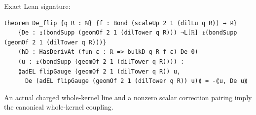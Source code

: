 \begin{theorem}[bp-113]
\begin{itemize}
\end{itemize}
\par Exact Lean signature:
\begin{verbatim}
theorem De_flip {q R : ℕ} {f : Bond (scaleUp 2 1 (dilLu q R)) → ℝ}
    {De : ↥(bondSupp (geomOf 2 1 (dilTower q R))) →L[ℝ] ↥(bondSupp (geomOf 2 1 (dilTower q R)))}
    (hD : HasDerivAt (fun ε : ℝ => bulkD q R f ε) De 0)
    (u : ↥(bondSupp (geomOf 2 1 (dilTower q R)))) :
    ⟪adEL flipGauge (geomOf 2 1 (dilTower q R)) u,
      De (adEL flipGauge (geomOf 2 1 (dilTower q R)) u)⟫ = -⟪u, De u⟫
\end{verbatim}
\end{theorem}

\begin{theorem}[bp-114]
\label{bp-114}
\leanok
An actual charged whole-kernel line and a nonzero scalar correction pairing imply the canonical whole-kernel coupling.


\end{theorem}
